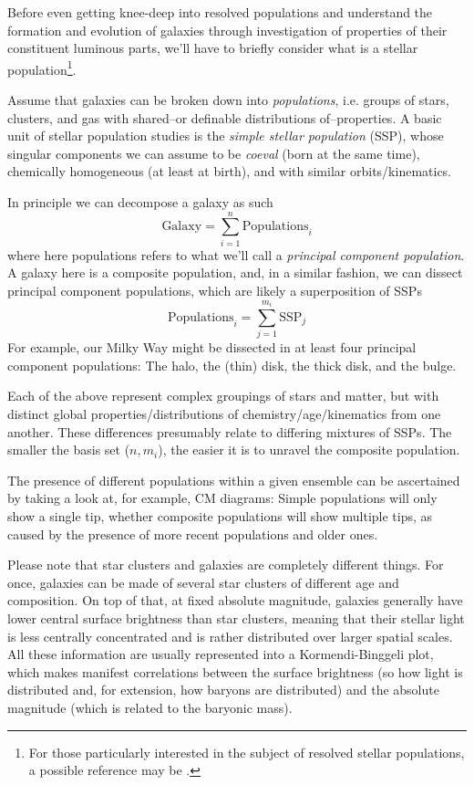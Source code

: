 Before even getting knee-deep into resolved populations and understand the formation and evolution of galaxies through investigation of properties of their constituent luminous parts, we'll have to briefly consider what is a stellar population\footnote{For those particularly interested in the subject of resolved stellar populations, a possible reference may be \cite{2010AdAst2010E...3C}.}.
\par Assume that galaxies can be broken down into \emph{populations}, i.e. groups of stars, clusters, and gas with shared--or definable distributions of--properties. A basic unit of stellar population studies is the \emph{simple stellar population} (SSP), whose singular components we can assume to be \emph{coeval} (born at the same time), chemically homogeneous (at least at birth), and with similar orbits/kinematics.
\par In principle we can decompose a galaxy as such 
\begin{equation*}
    \text{Galaxy} = \sum_{i=1}^{n}\text{Populations}_{i}
\end{equation*}
where here populations refers to what we'll call a \emph{principal component population}. A galaxy here is a composite population, and, in a similar fashion, we can dissect principal component populations, which are likely a superposition of SSPs
\begin{equation*}
    \text{Populations}_{i} = \sum_{j=1}^{m_{i}}\text{SSP}_{j}
\end{equation*}
For example, our Milky Way might be dissected in at least four principal component populations: The halo, the (thin) disk, the thick disk, and the bulge.
\par Each of the above represent complex groupings of stars and matter, but with distinct global properties/distributions of chemistry/age/kinematics from one another. These differences presumably relate to differing mixtures of SSPs. The smaller the basis set ($n,m_{i}$), the easier it is to unravel the composite population.
\par The presence of different populations within a given ensemble can be ascertained by taking a look at, for example, CM diagrams: Simple populations will only show a single tip, whether composite populations will show multiple tips, as caused by the presence of more recent populations and older ones. 
\par Please note that star clusters and galaxies are completely different things. For once, galaxies can be made of several star clusters of different age and composition. On top of that, at fixed absolute magnitude, galaxies generally have lower central surface brightness than star clusters, meaning that their stellar light is less centrally concentrated and is rather distributed over larger spatial scales. All these information are usually represented into a Kormendi-Binggeli plot, which makes manifest correlations between the surface brightness (so how light is distributed and, for extension, how baryons are distributed) and the absolute magnitude (which is related to the baryonic mass).
